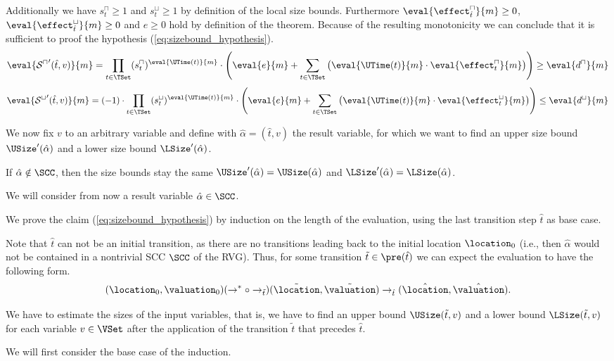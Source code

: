 Additionally we have $s^\sqcap_t \geq 1$ and $s^\sqcup_t \geq 1$ by definition of the local size bounds.
Furthermore $\eval{\effect^\sqcap_{\hat{t}}}{m} \geq 0$, $\eval{\effect^\sqcup_{\hat{t}}}{m} \geq 0$ and $e \geq 0$ hold by definition of the theorem.
Because of the resulting monotonicity we can conclude that it is sufficient to proof the hypothesis (\ref{eq:sizebound_hypothesis}). 
\[ \eval{{\mathcal{S}^\sqcap}'(\hat{t},v)}{m} =
   \prod_{t \in \TSet} (s^\sqcap_t)^{\eval{\UTime(t)}{m}} \cdot \left( \eval{e}{m} + \sum_{t \in \TSet} \left( \eval{\UTime(t)}{m} \cdot \eval{\effect^\sqcap_t}{m} \right) \right) \geq \eval{d^\sqcap}{m} \]
\[ \eval{{\mathcal{S}^\sqcup}'(\hat{t},v)}{m} =
   (-1) \cdot \prod_{t \in \TSet} (s^\sqcup_t)^{\eval{\UTime(t)}{m}} \cdot \left( \eval{e}{m} + \sum_{t \in \TSet} \left( \eval{\UTime(t)}{m} \cdot \eval{\effect^\sqcup_t}{m} \right) \right) \leq \eval{d^\sqcup}{m} \]

We now fix $v$ to an arbitrary variable and define with $\hat{\alpha} = (\hat{t}, v)$ the result variable, for which we want to find an upper size bound $\USize'(\hat{\alpha})$ and a lower size bound $\LSize'(\hat{\alpha})$.

If $\hat{\alpha} \notin \SCC$, then the size bounds stay the same $\USize'(\hat{\alpha}) = \USize(\hat{\alpha})$ and $\LSize'(\hat{\alpha}) = \LSize(\hat{\alpha})$.

We will consider from now a result variable $\hat{\alpha} \in \SCC$.

We prove the claim (\ref{eq:sizebound_hypothesis}) by induction on the length of the evaluation, using the last transition step $\hat{t}$ as base case.

Note that $\hat{t}$ can not be an initial transition, as there are no transitions leading back to the initial location $\location_0$
(i.e., then $\hat{\alpha}$ would not be contained in a nontrivial SCC $\SCC$ of the RVG).
Thus, for some transition $\tilde{t} \in \pre(\hat{t})$ we can expect the evaluation to have the following form.
\[ (\location_0, \valuation_0) (\rightarrow^* \circ \rightarrow_{\tilde{t}}) (\tilde{\location}, \tilde{\valuation}) \rightarrow_{\hat{t}} (\hat{\location}, \hat{\valuation}). \]

We have to estimate the sizes of the input variables, that is, we have to find an upper bound $\USize(\tilde{t}, v)$ and a lower bound $\LSize(\tilde{t}, v)$ for each variable $v \in \VSet$ after the application of the transition $\tilde{t}$ that precedes $\hat{t}$.

We will first consider the base case of the induction.

